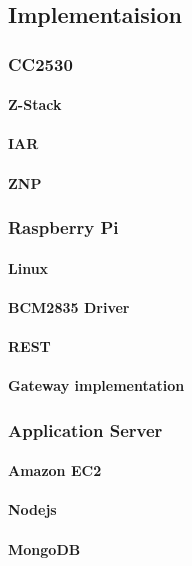 \documentclass[a4paper,12pt,english]{article}
\begin{document}
\subsection{Implementaision}
\subsubsection{CC2530}
	\paragraph{Z-Stack}
	\paragraph{IAR}
	\paragraph{ZNP}

\subsubsection{Raspberry Pi}
\paragraph{Linux}
\paragraph{BCM2835 Driver}
\paragraph{REST}
\paragraph{Gateway implementation}

\subsubsection{Application Server}
\paragraph{Amazon EC2}
\paragraph{Nodejs}
\paragraph{MongoDB}
\end{document}
